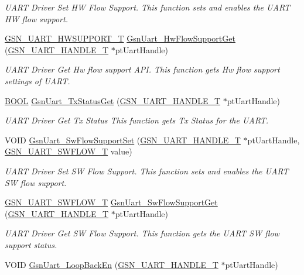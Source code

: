 \begin{DoxyCompactItemize}
\begin{DoxyCompactList}\small\item\em UART Driver Set HW Flow Support. This function sets and enables the UART HW flow support. \end{DoxyCompactList}\item 
\hyperlink{a00656_gaf4df97392dfefed655a81fe500a74162}{GSN\_\-UART\_\-HWSUPPORT\_\-T} \hyperlink{a00656_ga257ed612df03564408836a8debee880a}{GsnUart\_\-HwFlowSupportGet} (\hyperlink{a00266}{GSN\_\-UART\_\-HANDLE\_\-T} $\ast$ptUartHandle)
\begin{DoxyCompactList}\small\item\em UART Driver Get Hw flow support API. This function gets Hw flow support settings of UART. \end{DoxyCompactList}\item 
\hyperlink{a00660_ga1f04022c0a182c51c059438790ea138c}{BOOL} \hyperlink{a00656_gaa01ab358548634ea6ecb2d188bb05ea7}{GsnUart\_\-TxStatusGet} (\hyperlink{a00266}{GSN\_\-UART\_\-HANDLE\_\-T} $\ast$ptUartHandle)
\begin{DoxyCompactList}\small\item\em UART Driver Get Tx Status This function gets Tx Status for the UART. \end{DoxyCompactList}\item 
VOID \hyperlink{a00656_ga956677b6d98e04883e319782e1978b22}{GsnUart\_\-SwFlowSupportSet} (\hyperlink{a00266}{GSN\_\-UART\_\-HANDLE\_\-T} $\ast$ptUartHandle, \hyperlink{a00656_gae4fa00cd25fb7d023d1016b79b520542}{GSN\_\-UART\_\-SWFLOW\_\-T} value)
\begin{DoxyCompactList}\small\item\em UART Driver Set SW Flow Support. This function sets and enables the UART SW flow support. \end{DoxyCompactList}\item 
\hyperlink{a00656_gae4fa00cd25fb7d023d1016b79b520542}{GSN\_\-UART\_\-SWFLOW\_\-T} \hyperlink{a00656_ga95f5a07299d754d9bee8165152d9dd27}{GsnUart\_\-SwFlowSupportGet} (\hyperlink{a00266}{GSN\_\-UART\_\-HANDLE\_\-T} $\ast$ptUartHandle)
\begin{DoxyCompactList}\small\item\em UART Driver Get SW Flow Support. This function gets the UART SW flow support status. \end{DoxyCompactList}\item 
VOID \hyperlink{a00656_ga4f4f8c34cc82ac1a0a5f4751190f2301}{GsnUart\_\-LoopBackEn} (\hyperlink{a00266}{GSN\_\-UART\_\-HANDLE\_\-T} $\ast$ptUartHandle)

\end{DoxyCompactItemize}
